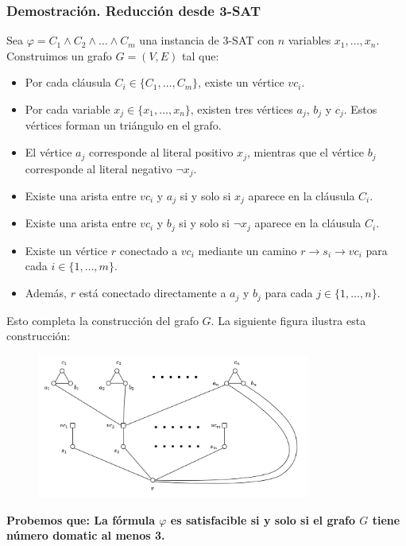 \documentclass[a4paper,12pt]{article}
\begin{document}
\subsubsection{Demostración. Reducción desde 3-SAT}
Sea $\varphi = C_1 \land C_2 \land \dots \land C_m$ una instancia de \textsc{3-SAT} con $n$ variables $x_1, \dots, x_n$. Construimos un grafo $G = (V, E)$ tal que:
\begin{itemize}
    \item Por cada cláusula $C_i \in \{C_1, \dots, C_m\}$, existe un vértice $vc_i$.
    \item Por cada variable $x_j \in \{x_1, \dots, x_n\}$, existen tres vértices $a_j$, $b_j$ y $c_j$. Estos vértices forman un triángulo en el grafo.
    \item El vértice $a_j$ corresponde al literal positivo $x_j$, mientras que el vértice $b_j$ corresponde al literal negativo $\neg x_j$.
    \item Existe una arista entre $vc_i$ y $a_j$ si y solo si $x_j$ aparece en la cláusula $C_i$.
    \item Existe una arista entre $vc_i$ y $b_j$ si y solo si $\neg x_j$ aparece en la cláusula $C_i$.
    \item Existe un vértice $r$ conectado a $vc_i$ mediante un camino $r \to s_i \to vc_i$ para cada $i \in \{1, \dots, m\}$.
    \item Además, $r$ está conectado directamente a $a_j$ y $b_j$ para cada $j \in \{1, \dots, n\}$.
\end{itemize}

Esto completa la construcción del grafo $G$. La siguiente figura ilustra esta construcción:

\begin{figure}[h]
    \centering
    \includegraphics[width=0.8\textwidth]{assets/domatic.png}
    \label{fig:domatic}
\end{figure}

\newpage
\textbf{Probemos que: La fórmula $\varphi$ es satisfacible si y solo si el grafo $G$ tiene número domatic al menos 3.}
\end{document}
